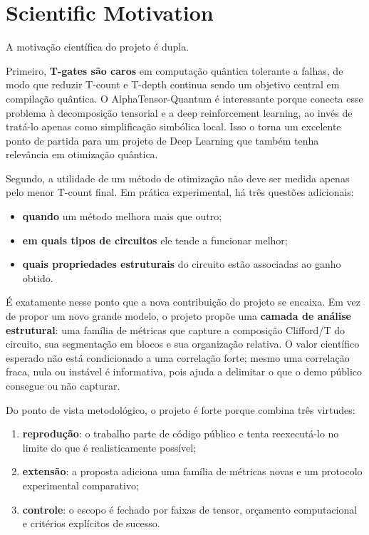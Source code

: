 \documentclass[a4paper,11pt]{article}
\begin{document}
\section{Scientific Motivation}

A motivação científica do projeto é dupla.

Primeiro, \textbf{T-gates são caros} em computação quântica tolerante a falhas, de modo que reduzir T-count e T-depth continua sendo um objetivo central em compilação quântica. O AlphaTensor-Quantum é interessante porque conecta esse problema à decomposição tensorial e a deep reinforcement learning, ao invés de tratá-lo apenas como simplificação simbólica local. Isso o torna um excelente ponto de partida para um projeto de Deep Learning que também tenha relevância em otimização quântica.

Segundo, a utilidade de um método de otimização não deve ser medida apenas pelo menor T-count final. Em prática experimental, há três questões adicionais:
\begin{itemize}
  \item \textbf{quando} um método melhora mais que outro;
  \item \textbf{em quais tipos de circuitos} ele tende a funcionar melhor;
  \item \textbf{quais propriedades estruturais} do circuito estão associadas ao ganho obtido.
\end{itemize}

É exatamente nesse ponto que a nova contribuição do projeto se encaixa. Em vez de propor um novo grande modelo, o projeto propõe uma \textbf{camada de análise estrutural}: uma família de métricas que capture a composição Clifford/T do circuito, sua segmentação em blocos e sua organização relativa. O valor científico esperado não está condicionado a uma correlação forte; mesmo uma correlação fraca, nula ou instável é informativa, pois ajuda a delimitar o que o demo público consegue ou não capturar.

Do ponto de vista metodológico, o projeto é forte porque combina três virtudes:
\begin{enumerate}
  \item \textbf{reprodução}: o trabalho parte de código público e tenta reexecutá-lo no limite do que é realisticamente possível;
  \item \textbf{extensão}: a proposta adiciona uma família de métricas novas e um protocolo experimental comparativo;
  \item \textbf{controle}: o escopo é fechado por faixas de tensor, orçamento computacional e critérios explícitos de sucesso.
\end{enumerate}
\end{document}
